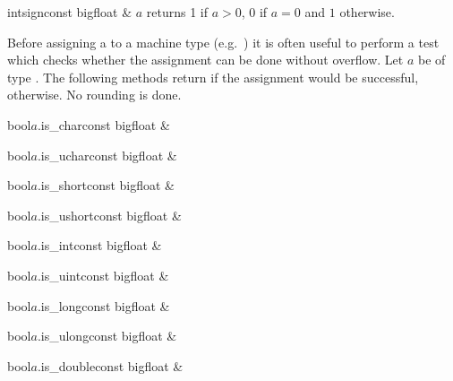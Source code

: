 \begin{fcode}{int}{sign}{const bigfloat & $a$}
  returns 1 if $a > 0$, $0$ if $a = 0$ and $1$ otherwise.
\end{fcode}



\TYPE

Before assigning a  to a machine type (e.g.~) it is often useful to
perform a test which checks whether the assignment can be done without overflow.  Let $a$ be of
type .  The following methods return \TRUE if the assignment would be successful,
\FALSE otherwise.  No rounding is done.

\begin{fcode}{bool}{$a$.is_char}{const bigfloat &}\end{fcode}
\begin{fcode}{bool}{$a$.is_uchar}{const bigfloat &}\end{fcode}
\begin{fcode}{bool}{$a$.is_short}{const bigfloat &}\end{fcode}
\begin{fcode}{bool}{$a$.is_ushort}{const bigfloat &}\end{fcode}
\begin{fcode}{bool}{$a$.is_int}{const bigfloat &}\end{fcode}
\begin{fcode}{bool}{$a$.is_uint}{const bigfloat &}\end{fcode}
\begin{fcode}{bool}{$a$.is_long}{const bigfloat &}\end{fcode}
\begin{fcode}{bool}{$a$.is_ulong}{const bigfloat &}\end{fcode}
\begin{fcode}{bool}{$a$.is_double}{const bigfloat &}\end{fcode}

